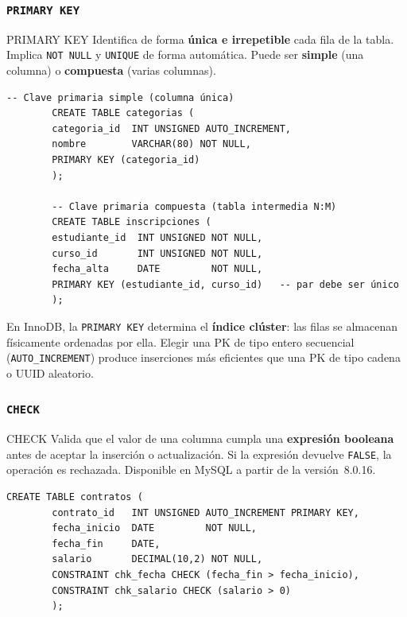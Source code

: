 \documentclass[12pt, a4paper]{article}
\begin{document}
	\subsubsection{\texttt{PRIMARY KEY}}
	
	\begin{definicion}{PRIMARY KEY}
		Identifica de forma \textbf{única e irrepetible} cada fila de la tabla.
		Implica \texttt{NOT NULL} y \texttt{UNIQUE} de forma automática. Puede
		ser \textbf{simple} (una columna) o \textbf{compuesta} (varias columnas).
	\end{definicion}
	
	\begin{lstlisting}[style=sql, caption={PK simple vs.\ PK compuesta}]
		-- Clave primaria simple (columna única)
		CREATE TABLE categorias (
		categoria_id  INT UNSIGNED AUTO_INCREMENT,
		nombre        VARCHAR(80) NOT NULL,
		PRIMARY KEY (categoria_id)
		);
		
		-- Clave primaria compuesta (tabla intermedia N:M)
		CREATE TABLE inscripciones (
		estudiante_id  INT UNSIGNED NOT NULL,
		curso_id       INT UNSIGNED NOT NULL,
		fecha_alta     DATE         NOT NULL,
		PRIMARY KEY (estudiante_id, curso_id)   -- par debe ser único
		);
	\end{lstlisting}
	
	\begin{nota}
		En InnoDB, la \texttt{PRIMARY KEY} determina el \textbf{índice clúster}:
		las filas se almacenan físicamente ordenadas por ella. Elegir una PK de
		tipo entero secuencial (\texttt{AUTO\_INCREMENT}) produce inserciones más
		eficientes que una PK de tipo cadena o UUID aleatorio.
	\end{nota}
	
	\subsubsection{\texttt{CHECK}}
	
	\begin{definicion}{CHECK}
		Valida que el valor de una columna cumpla una \textbf{expresión booleana}
		antes de aceptar la inserción o actualización. Si la expresión devuelve
		\texttt{FALSE}, la operación es rechazada. Disponible en MySQL a partir
		de la versión~8.0.16.
	\end{definicion}
	
	\begin{lstlisting}[style=sql, caption={CHECK a nivel de columna y de tabla}]
		CREATE TABLE contratos (
		contrato_id   INT UNSIGNED AUTO_INCREMENT PRIMARY KEY,
		fecha_inicio  DATE         NOT NULL,
		fecha_fin     DATE,
		salario       DECIMAL(10,2) NOT NULL,
		CONSTRAINT chk_fecha CHECK (fecha_fin > fecha_inicio),
		CONSTRAINT chk_salario CHECK (salario > 0)
		);
	\end{lstlisting}
	
\end{document}
